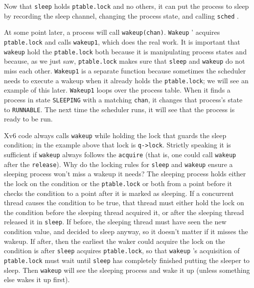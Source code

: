 Now that
\lstinline{sleep}
holds
\lstinline{ptable.lock}
and no others,
it can put the process to sleep by recording
the sleep channel,
changing the process state,
and calling
\lstinline{sched}
.

At some point later, a process will call
\lstinline{wakeup(chan)}.
\lstinline{Wakeup}
'
acquires
\lstinline{ptable.lock}
and calls
\lstinline{wakeup1},
which does the real work.
It is important that
\lstinline{wakeup}
hold the
\lstinline{ptable.lock}
both because it is manipulating process states
and because, as we just saw,
\lstinline{ptable.lock}
makes sure that
\lstinline{sleep}
and
\lstinline{wakeup}
do not miss each other.
\lstinline{Wakeup1}
is a separate function because
sometimes the scheduler needs to
execute a wakeup when it already
holds the 
\lstinline{ptable.lock};
we will see an example of this later.
\lstinline{Wakeup1}
loops over the process table.
When it finds a process in state
\lstinline{SLEEPING}
with a matching
\lstinline{chan},
it changes that process's state to
\lstinline{RUNNABLE}.
The next time the scheduler runs, it will
see that the process is ready to be run.

Xv6 code always calls
\lstinline{wakeup}
while holding the lock that guards the sleep condition;
in the example above that lock is
\lstinline{q->lock}.
Strictly speaking it is sufficient if
\lstinline{wakeup}
always follows the
\lstinline{acquire}
(that is, one could call
\lstinline{wakeup}
after the
\lstinline{release}).
Why do the locking rules for 
\lstinline{sleep}
and
\lstinline{wakeup}
ensure a sleeping process won't miss a wakeup it needs?
The sleeping process holds either
the lock on the condition or the
\lstinline{ptable.lock} 
or both from a point before it checks the condition
to a point after it is marked as sleeping.
If a concurrent thread causes the condition to be true,
that thread must either hold the lock on the condition before the
sleeping thread acquired it, or after the sleeping
thread released it in
\lstinline{sleep}.
If before, the sleeping thread must have seen the new condition
value, and decided to sleep anyway, so it doesn't matter
if it misses the wakeup.
If after, then the earliest the waker could acquire the
lock on the condition is after
\lstinline{sleep}
acquires
\lstinline{ptable.lock},
so that
\lstinline{wakeup} 's
acquisition of
\lstinline{ptable.lock}
must wait until
\lstinline{sleep}
has completely finished putting the sleeper to sleep.
Then 
\lstinline{wakeup}
will see the sleeping process and wake it up
(unless something else wakes it up first).

